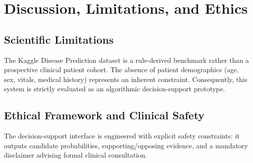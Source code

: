 \section{Discussion, Limitations, and Ethics}
\label{sec:discussion}

\subsection{Scientific Limitations}
The Kaggle Disease Prediction dataset is a rule-derived benchmark rather than a prospective clinical patient cohort. The absence of patient demographics (age, sex, vitals, medical history) represents an inherent constraint. Consequently, this system is strictly evaluated as an algorithmic decision-support prototype.

\subsection{Ethical Framework and Clinical Safety}
The decision-support interface is engineered with explicit safety constraints: it outputs candidate probabilities, supporting/opposing evidence, and a mandatory disclaimer advising formal clinical consultation.
